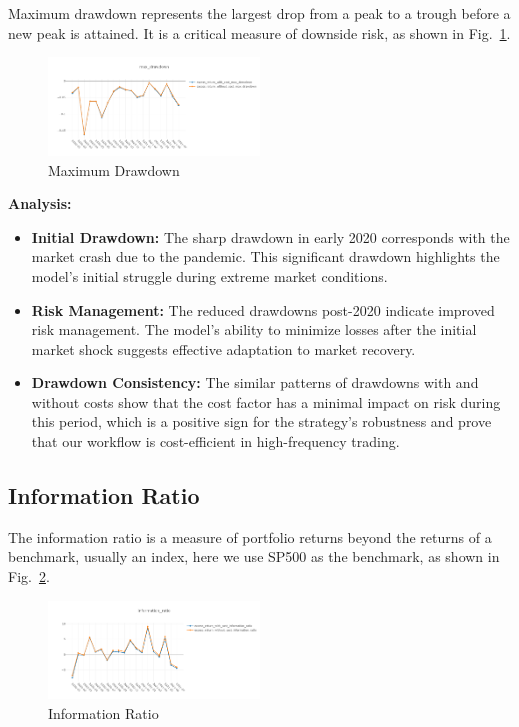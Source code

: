 \documentclass[conference]{IEEEtran}
\begin{document}
Maximum drawdown represents the largest drop from a peak to a trough before a new peak is attained. It is a critical measure of downside risk, as shown in Fig.~\ref{fig:maximum drawdown}.

\begin{figure}[h!]
\centering
    \includegraphics[width=0.5\textwidth]{max_drawdown.png}
    \caption{Maximum Drawdown}
    \label{fig:maximum drawdown}
\end{figure}

\textbf{Analysis:}
\begin{itemize}
    \item \textbf{Initial Drawdown:} The sharp drawdown in early 2020 corresponds with the market crash due to the pandemic. This significant drawdown highlights the model's initial struggle during extreme market conditions.
    \item \textbf{Risk Management:} The reduced drawdowns post-2020 indicate improved risk management. The model's ability to minimize losses after the initial market shock suggests effective adaptation to market recovery.
    \item \textbf{Drawdown Consistency:} The similar patterns of drawdowns with and without costs show that the cost factor has a minimal impact on risk during this period, which is a positive sign for the strategy's robustness and prove that our workflow is cost-efficient in high-frequency trading.
\end{itemize}

\begin{center}
    \subsection*{\textbf{Information Ratio}}
\end{center}

The information ratio is a measure of portfolio returns beyond the returns of a benchmark, usually an index, here we use SP500 as the benchmark, as shown in Fig.~\ref{fig:information ratio}.

\begin{figure}[h!]
\centering
    \includegraphics[width=0.5\textwidth]{information_ratio.png}
    \caption{Information Ratio}
    \label{fig:information ratio}
\end{figure}
\end{document}

